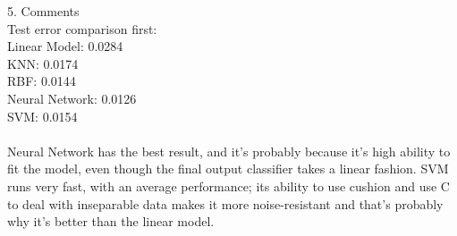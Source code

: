 \documentclass[12pt]{article}
\begin{document}
5. Comments\\
Test error comparison first:\\
Linear Model: 0.0284\\
KNN: 0.0174\\
RBF: 0.0144\\
Neural Network: 0.0126\\
SVM: 0.0154\\\\
Neural Network has the best result, and it's probably because it's high ability to fit the model, even though the final output classifier takes a linear fashion. SVM runs very fast, with an average performance; its ability to use cushion and use C to deal with inseparable data makes it more noise-resistant and that's probably why it's better than the linear model.\\
\end{document}
